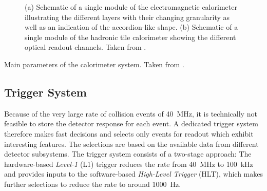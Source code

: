 \begin{figure}
    \caption{(a) Schematic of a single module of the electromagnetic calorimeter illustrating the different layers with their changing granularity as well as an indication of the accordion-like shape. (b) Schematic of a single module of the hadronic tile calorimeter showing the different optical readout channels. Taken from .}
    \label{fig:ATLASmodules}
\end{figure}

\begin{table}
    \caption{Main parameters of the calorimeter system. Taken from .}
    \label{tab:ATLAScalorimeter-parameters}
\end{table}


\subsection{Trigger System}
\label{sec:trigger-system}
Because of the very large rate of collision events of \SI{40}{\mega\hertz}, it is technically not feasible to store the detector response for each event.
A dedicated trigger system therefore makes fast decisions and selects only events for readout which exhibit interesting features.
The selections are based on the available data from different detector subsystems.
The \RunTwo trigger system consists of a two-stage approach:
The hardware-based \emph{Level-1} (L1) trigger reduces the rate from \SI{40}{\mega\hertz} to \SI{100}{\kilo\hertz} and provides inputs to the software-based \emph{High-Level Trigger} (HLT), which makes further selections to reduce the rate to around \SI{1000}{\hertz}.

